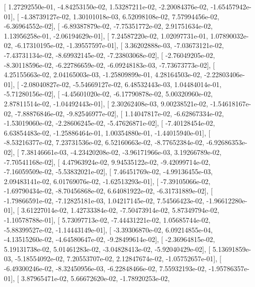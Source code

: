 \documentclass{article}
\begin{document}
       [  1.27292550e-01,  -4.84253150e-02,   1.53287211e-02,
         -2.20084376e-02,  -1.65457942e-01],
       [ -4.38739127e-02,   1.30101018e-03,   6.52098108e-02,
          7.57994456e-02,  -6.36964552e-02],
       [ -6.89387879e-02,  -7.75351772e-02,   2.91751634e-02,
          1.13956258e-01,  -2.06194629e-01],
       [  7.24587220e-02,   1.02097731e-01,   1.07890032e-02,
         -6.17310195e-02,  -1.39557597e-01],
       [  3.36202888e-03,  -7.03673121e-02,  -7.43731134e-02,
         -8.69932145e-02,  -7.23803068e-02],
       [ -2.76049205e-02,  -8.30118596e-02,  -6.22786659e-02,
         -6.09248183e-03,  -7.73673773e-02],
       [  4.25155663e-02,   2.04165003e-03,  -1.25809899e-01,
          4.28164503e-02,  -2.22803406e-01],
       [ -2.08040827e-02,  -5.54669127e-02,   6.48532443e-03,
          1.04484014e-01,  -5.71280156e-02],
       [ -4.45601020e-02,  -6.17790878e-02,   5.00320960e-02,
          2.87811514e-02,  -1.04492443e-01],
       [  2.30262408e-03,   9.00238521e-02,  -1.54618167e-02,
         -7.88876846e-02,  -9.82546977e-02],
       [  1.14047817e-02,  -6.62867334e-02,  -1.53019060e-02,
         -2.28606245e-02,  -5.47626871e-02],
       [ -7.40128454e-02,   6.63854483e-02,  -1.25886464e-01,
          1.00354880e-01,  -1.44015940e-01],
       [ -8.53216377e-02,   7.23731536e-02,   6.52160663e-02,
         -8.77652384e-02,  -6.92686353e-02],
       [  7.38146661e-03,  -4.23420208e-02,  -3.96171966e-03,
          3.19266789e-02,  -7.70541168e-02],
       [  4.47963924e-02,   9.94535122e-02,  -9.42099714e-02,
         -7.16059509e-02,  -5.53832021e-02],
       [  7.46451769e-02,  -4.99136455e-03,   2.09483141e-02,
          6.01769076e-02,  -1.62513293e-01],
       [ -7.39105066e-02,  -1.69790434e-02,  -8.70456868e-02,
          6.64081922e-02,  -6.31731889e-02],
       [ -1.79866591e-02,  -7.12825181e-03,   1.04217145e-02,
          7.54566423e-02,  -1.96612280e-01],
       [  3.61227014e-02,   1.42733384e-02,  -7.50473914e-02,
          5.87349794e-02,  -1.10578788e-01],
       [  5.73097713e-02,  -7.44431221e-02,   1.05685744e-02,
         -5.88399527e-02,  -1.14443149e-01],
       [ -3.39306870e-02,   6.09214855e-04,  -4.13515260e-02,
         -4.64580647e-02,  -9.28499614e-02],
       [ -2.36964815e-02,   5.19131738e-02,   5.01461283e-02,
         -3.04828413e-02,  -5.92040429e-02],
       [  5.13691859e-03,  -5.18554092e-02,   7.20553707e-02,
          2.12847674e-02,  -1.05752657e-01],
       [ -6.49300246e-02,  -8.32450956e-03,  -6.22848466e-02,
          7.55932193e-02,  -1.95786357e-01],
       [  3.87965471e-02,   5.66672620e-02,  -1.78920253e-02,
\end{document}
